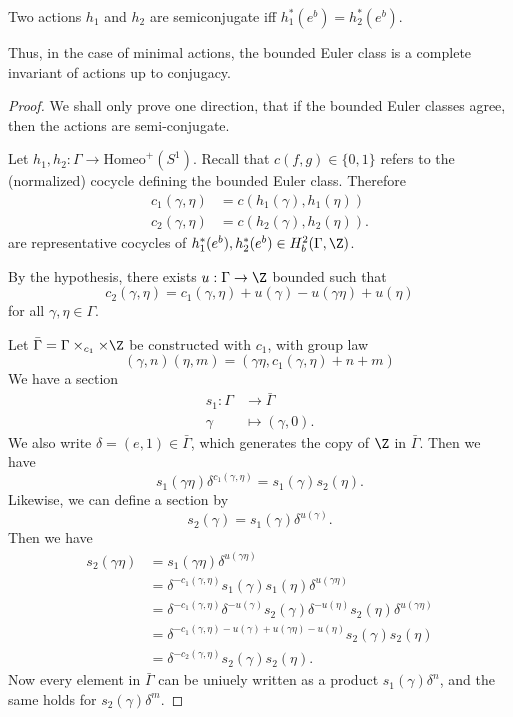 \documentclass[a4paper]{article}
\newcommand\Homeo{\mathrm{Homeo}}
\begin{document}
\begin{thm}[F. Ghys, 1984]
  Two actions $h_1$ and $h_2$ are semiconjugate iff $h_1^*(e^b) = h_2^*(e^b)$.
\end{thm}
Thus, in the case of minimal actions, the bounded Euler class is a complete invariant of actions up to conjugacy.

\begin{proof}
  We shall only prove one direction, that if the bounded Euler classes agree, then the actions are semi-conjugate.

  Let $h_1, h_2: \Gamma \to \Homeo^+(S^1)$. Recall that $c(f, g) \in \{0, 1\}$ refers to the (normalized) cocycle defining the bounded Euler class. Therefore
  \begin{align*}
    c_1(\gamma, \eta) &= c(h_1(\gamma), h_1(\eta))\\
    c_2(\gamma, \eta) &= c(h_2(\gamma), h_2(\eta)).
  \end{align*}
  are representative cocycles of $h_1^*(e^b), h_2^*(e^b) \in H_b^2(\Gamma, \Z)$.

  By the hypothesis, there exists $u: \Gamma \to \Z$ bounded such that
  \[
    c_2(\gamma, \eta) = c_1(\gamma, \eta) + u(\gamma) - u(\gamma\eta) + u(\eta)
  \]
  for all $\gamma, \eta \in \Gamma$.

  Let $\bar{\Gamma} = \Gamma \times_{c_1} \times \Z$ be constructed with $c_1$, with group law
  \[
    (\gamma, n)(\eta, m) = (\gamma \eta, c_1(\gamma, \eta) + n + m)
  \]
  We have a section
  \begin{align*}
    s_1: \Gamma &\to \bar{\Gamma} \\
    \gamma &\mapsto (\gamma, 0).
  \end{align*}
  We also write $\delta = (e, 1) \in \bar{\Gamma}$, which generates the copy of $\Z$ in $\bar{\Gamma}$. Then we have
  \[
    s_1(\gamma \eta) \delta^{c_1(\gamma, \eta)} = s_1(\gamma) s_2(\eta).
  \]
  Likewise, we can define a section by
  \[
    s_2(\gamma) = s_1(\gamma) \delta^{u(\gamma)}.
  \]
  Then we have
  \begin{align*}
    s_2(\gamma \eta) &= s_1 (\gamma \eta) \delta^{u(\gamma \eta)} \\
    &= \delta^{-c_1(\gamma, \eta)} s_1(\gamma) s_1 (\eta) \delta^{u(\gamma \eta)}\\
    &= \delta^{-c_1(\gamma, \eta)} \delta^{-u(\gamma)} s_2(\gamma) \delta^{-u(\eta)} s_2 (\eta) \delta^{u(\gamma \eta)}\\
    &= \delta^{-c_1(\gamma, \eta) - u(\gamma) + u(\gamma \eta) - u(\eta)} s_2 (\gamma) s_2(\eta)\\
    &= \delta^{-c_2(\gamma, \eta)} s_2(\gamma) s_2(\eta).
  \end{align*}
  Now every element in $\bar{\Gamma}$ can be uniuely written as a product $s_1(\gamma) \delta^n$, and the same holds for $s_2(\gamma) \delta^m$.


\end{proof}
\end{document}
